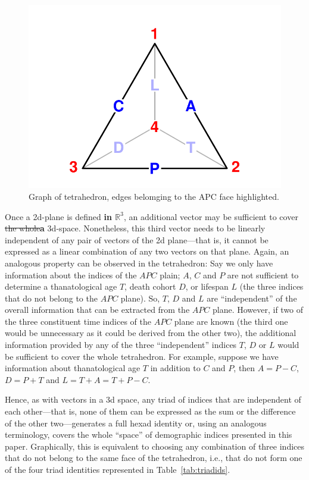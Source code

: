 \documentclass[12pt,oneside,letter]{article} %
\begin{document}
\begin{figure}[h!]
\centering
\caption{Graph of tetrahedron, edges belomging to the APC face highlighted.}
\label{fig:tet4vert1}
\includegraphics[scale=1]{Figures/tet4vert1New.pdf}
\end{figure}
\noindent 

Once a 2d-plane is defined \textbf{in $\mathbb{R}^3$}, an additional vector may be sufficient to cover \sout{the whole}\textbf{a} 
3d-space. Nonetheless, this third vector needs to be linearly independent
of any pair of vectors of the 2d plane---that is, it cannot be expressed as a
linear combination of any two vectors on that plane. Again, an analogous
property can be observed in the tetrahedron: Say we only have information about the indices of the $APC$ plain; $A$, $C$ and $P$ are not sufficient to determine a thanatological age $T$, death cohort $D$, or lifespan $L$ (the three indices that do not belong to the $APC$ plane). So, $T$, $D$ and $L$ are ``independent'' of the overall information that can be extracted from the $APC$ plane. However, if two of the three constituent time indices of the $APC$ plane are known (the third one would be unnecessary as it could be derived from the other two), the additional information provided by any of the three ``independent'' indices $T$, $D$ or $L$ would be sufficient to cover the whole tetrahedron. For example, suppose we have information about thanatological age $T$ in addition to $C$ and $P$, then
$A=P-C$, $D=P+T$ and $L=T+A=T+P-C$. 

Hence, as with vectors in a 3d space, any
triad of indices that are independent of each other---that is, none of them can
be expressed as the sum or the difference of the other two---generates a full
hexad identity or, using an analogous terminology, covers the whole ``space'' of
demographic indices presented in this paper. Graphically, this is equivalent to
choosing any combination of three indices that do not belong to the same face
of the tetrahedron, i.e., that do not form one of the four triad identities
represented in Table~\ref{tab:triadids}.
\end{document}
